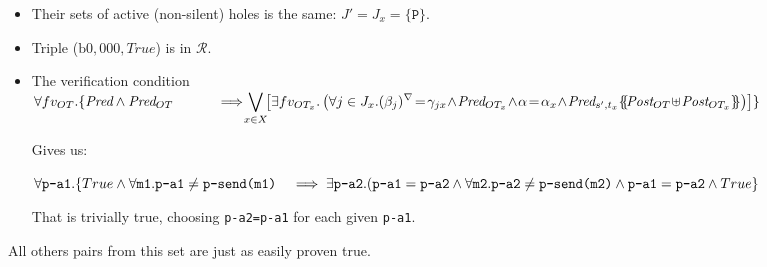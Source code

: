 \documentclass{lmcs}
\newcommand{\nounderline}[1]{#1}
\begin{document}
\begin{itemize}
  \item Their sets of active (non-silent) holes is the same: $J' = J_x = \{\texttt{P}\}$.
  \item Triple ($\text{b0},  000,  True$) is in $\mathcal{R}$.
  \item The verification condition \\
    $\forall fv_{OT}. \{ \Pred \land \Pred_{OT}\\
\hspace{1cm} \implies\!\!\! \displaystyle{\bigvee_{x\in X}\!\!
   \left[\exists fv_{OT_x}.
  \left( \forall j\in J_x. \vis{\beta_j}\!=\!\gamma_{jx}\! \land\! \Pred_{OT_x}
     \!\land\! \alpha\!=\!\alpha_x\! \land\!  
     \Pred_{s',t_x}\subst{\Post_{OT}\!\uplus\!\Post_{OT_x}}\right)\right]\}}$

\medskip Gives us:

$\forall \texttt{p-a1}. \{True \land \forall \texttt{m1}. \texttt{p-a1} \neq \texttt{p-send(m1)}\\
 \hspace{3mm} \implies \exists \texttt{p-a2}. 
(\texttt{p-a1} = \texttt{p-a2}
\land \forall \texttt{m2}. \texttt{p-a2} \neq \texttt{p-send(m2)}
\land \nounderline{\texttt{p-a1}} = \nounderline{\texttt{p-a2}} 
\land True\}$

\medskip That is trivially true, choosing \texttt{p-a2=p-a1} for each given \texttt{p-a1}.

\end{itemize}

  \bigskip
  All others pairs from this set are just as easily proven true.
\end{document}
